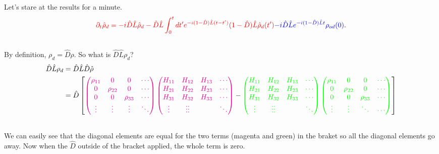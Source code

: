 \documentclass[letterpaper,10pt,english]{sphinxmanual}
\begin{document}
Let's stare at the results for a minute.
\begin{gather}
\begin{split}{\color{red}\partial_t \hat \rho_d = - i\hat D\hat L \hat \rho_d -  \hat D\hat L \int_0^t dt' e^{-i(1-\hat D) \hat L (t-t')}(1-\hat D)\hat L \hat \rho_d(t')} {\color{blue} - i \hat D \hat L e^{-i(1-\hat D)\hat L t} \rho_{od}(0) }.\end{split}\notag\\\begin{split}\end{split}\notag
\end{gather}
By definition, $\rho_d=\hat D\rho$. So what is $\hat D \hat L \rho_d$?
\begin{gather}
\begin{split}\hat D \hat L \rho_d & = \hat D\hat L \hat D \hat \rho \\
& = \hat D \left[ {\color{magenta}  \begin{pmatrix}\rho_{11} & 0 & 0 & \cdots \\ 0 & \rho_{22} & 0 & \cdots \\ 0 & 0 & \rho_{33} & \cdots  \\ \vdots & \vdots & \vdots &  \ddots  \end{pmatrix} \begin{pmatrix} H_{11} & H_{12} & H_{13} & \cdots \\ H_{21} & H_{22} & H_{23} & \cdots  \\ H_{31} & H_{32} & H_{33} & \cdots \\ \vdots & \vdots \vdots & & \ddots \end{pmatrix}    } -  {\color{green} \begin{pmatrix} H_{11} & H_{12} & H_{13} & \cdots \\ H_{21} & H_{22} & H_{23} & \cdots  \\ H_{31} & H_{32} & H_{33} & \cdots \\ \vdots & \vdots \vdots & & \ddots   \end{pmatrix} \begin{pmatrix} \rho_{11} & 0 & 0 & \cdots \\ 0 & \rho_{22} & 0 & \cdots \\  0 & 0 & \rho_{33} & \cdots \\ \vdots & \vdots & \ddots & \cdots \end{pmatrix} } \right]\end{split}\notag\\\begin{split}\end{split}\notag
\end{gather}
We can easily see that the diagonal elements are equal for the two terms (magenta and green) in the braket so all the diagonal elements go away. Now when the $\hat D$ outside of the bracket applied, the whole term is zero.
\end{document}
